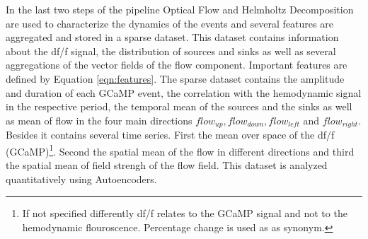 In the last two steps of the pipeline Optical Flow and Helmholtz Decomposition are used to characterize the dynamics of the events and several features are aggregated and stored in a sparse dataset. This dataset contains information about the df/f signal, the distribution of sources and sinks as well as several aggregations of the vector fields of the flow component. Important features are defined by Equation \ref{eqn:features}. The sparse dataset contains the amplitude and duration of each GCaMP event, the correlation with the hemodynamic signal in the respective period, the temporal mean of the sources and the sinks as well as mean of flow in the four main directions $flow_{up}, flow_{down}, flow_{left}$ and $flow_{right}$. Besides it contains several time series. First the mean over space of the df/f (GCaMP)\footnote{If not specified differently df/f relates to the GCaMP signal and not to the hemodynamic flouroscence. Percentage change is used as as synonym.}. Second the spatial mean of the flow in different directions and third the spatial mean of field strengh of the flow field. This dataset is analyzed quantitatively using Autoencoders.\\

